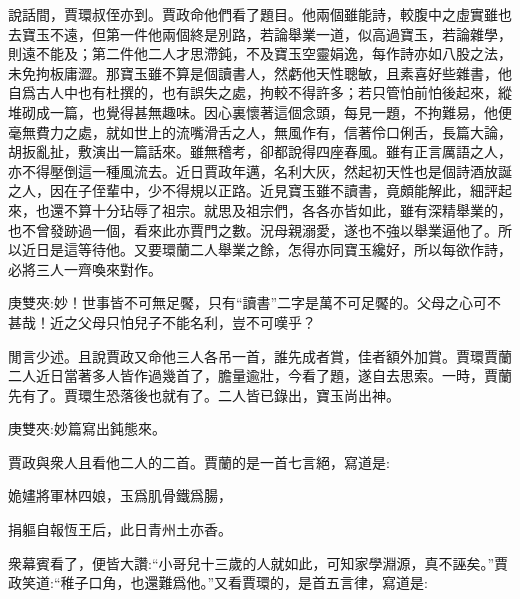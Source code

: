 \begin{parag}
    說話間，賈環叔侄亦到。賈政命他們看了題目。他兩個雖能詩，較腹中之虛實雖也去寶玉不遠，但第一件他兩個終是別路，若論舉業一道，似高過寶玉，若論雜學，則遠不能及；第二件他二人才思滯鈍，不及寶玉空靈娟逸，每作詩亦如八股之法，未免拘板庸澀。那寶玉雖不算是個讀書人，然虧他天性聰敏，且素喜好些雜書，他自爲古人中也有杜撰的，也有誤失之處，拘較不得許多；若只管怕前怕後起來，縱堆砌成一篇，也覺得甚無趣味。因心裏懷著這個念頭，每見一題，不拘難易，他便毫無費力之處，就如世上的流嘴滑舌之人，無風作有，信著伶口俐舌，長篇大論，胡扳亂扯，敷演出一篇話來。雖無稽考，卻都說得四座春風。雖有正言厲語之人，亦不得壓倒這一種風流去。近日賈政年邁，名利大灰，然起初天性也是個詩酒放誕之人，因在子侄輩中，少不得規以正路。近見寶玉雖不讀書，竟頗能解此，細評起來，也還不算十分玷辱了祖宗。就思及祖宗們，各各亦皆如此，雖有深精舉業的，也不曾發跡過一個，看來此亦賈門之數。況母親溺愛，遂也不強以舉業逼他了。所以近日是這等待他。又要環蘭二人舉業之餘，怎得亦同寶玉纔好，所以每欲作詩，必將三人一齊喚來對作。\begin{note}庚雙夾:妙！世事皆不可無足饜，只有“讀書”二字是萬不可足饜的。父母之心可不甚哉！近之父母只怕兒子不能名利，豈不可嘆乎？\end{note}
\end{parag}


\begin{parag}
    閒言少述。且說賈政又命他三人各吊一首，誰先成者賞，佳者額外加賞。賈環賈蘭二人近日當著多人皆作過幾首了，膽量逾壯，今看了題，遂自去思索。一時，賈蘭先有了。賈環生恐落後也就有了。二人皆已錄出，寶玉尚出神。\begin{note}庚雙夾:妙篇寫出鈍態來。\end{note}賈政與衆人且看他二人的二首。賈蘭的是一首七言絕，寫道是:
\end{parag}


\begin{poem}
    \begin{pl}姽嫿將軍林四娘，玉爲肌骨鐵爲腸，\end{pl}

    \begin{pl}捐軀自報恆王后，此日青州土亦香。\end{pl}
\end{poem}


\begin{parag}
    衆幕賓看了，便皆大讚:“小哥兒十三歲的人就如此，可知家學淵源，真不誣矣。”賈政笑道:“稚子口角，也還難爲他。”又看賈環的，是首五言律，寫道是:
\end{parag}



